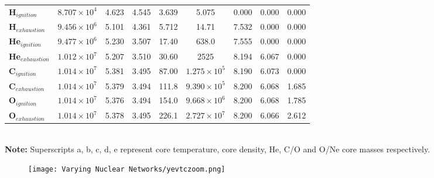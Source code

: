 \begin{table}[h]
\begin{tabular}{lcccccccc}
        \midrule
        \textbf{H$_{ignition}$} & $8.707 \times 10^4$  & 4.623 & 4.545 & 3.639  & 5.075 & 0.000  & 0.000  & 0.000  \\
        \textbf{H$_{exhaustion}$} & $9.456 \times 10^6$  & 5.101 & 4.361 & 5.712  & 14.71 & 7.532  & 0.000  & 0.000  \\
        \textbf{He$_{ignition}$} & $9.477 \times 10^6$  & 5.230 & 3.507 & 17.40  & 638.0 & 7.555  & 0.000  & 0.000  \\
        \textbf{He$_{exhaustion}$} & $1.012 \times 10^7$  & 5.207 & 3.510 & 30.60 & 2525 & 8.194  & 6.067  & 0.000  \\
        \textbf{C$_{ignition}$} & $1.014 \times 10^7$  & 5.381 & 3.495 & 87.00  & $1.275 \times 10^5$  & 8.190  & 6.073  & 0.000  \\
        \textbf{C$_{exhaustion}$} & $1.014 \times 10^7$  & 5.379 & 3.494 & 111.8  & $9.390 \times 10^5$  & 8.200  & 6.068  & 1.685  \\
        \textbf{O$_{ignition}$} & $1.014 \times 10^7$  & 5.376 & 3.494 & 154.0  & $9.668 \times 10^6$ & 8.200  & 6.068  & 1.785  \\
        \textbf{O$_{exhaustion}$} & $1.014 \times 10^7$  & 5.378 & 3.495 & 226.1 & $2.727 \times 10^7$ & 8.200  & 6.066  & 2.612  \\        	\bottomrule
    \end{tabular}
    \vspace{0.5em} \\
    \textbf{Note:} Superscripts a, b, c, d, e represent core temperature, core density, He, C/O and O/Ne core masses respectively.
    \label{tab:stellar_stages}
\end{table}

\begin{figure}[h!]
	\centering
	\texttt{[image: Varying Nuclear Networks/yevtczoom.png]}
\label{fig:YevTc}
\end{figure}
\vspace{-1em}

